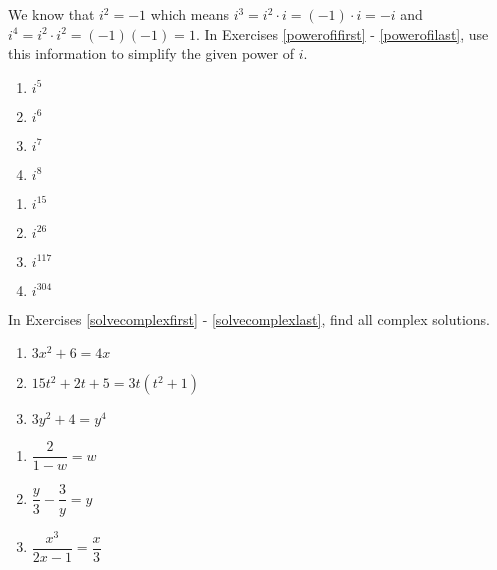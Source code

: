 \documentclass[10pt]{article}
\begin{document}
We know that $i^{2} = -1$ which means $i^{3} = i^{2} \cdot i = (-1) \cdot i = -i$ and $i^{4} = i^{2} \cdot i^{2} = (-1)(-1) = 1$. In Exercises \ref{powerofifirst} - \ref{powerofilast}, use this information to simplify the given power of $i$.

\begin{multicols}{4}
\begin{enumerate}
\setcounter{enumi}{\value{HW}}

\item $i^{5}$ \label{powerofifirst}
\item $i ^{6}$
\item $i^{7}$
\item $i^{8}$

\setcounter{HW}{\value{enumi}}
\end{enumerate}
\end{multicols}

\begin{multicols}{4}
\begin{enumerate}
\setcounter{enumi}{\value{HW}}

\item $i^{15}$
\item $i^{26}$
\item $i^{117}$
\item $i^{304}$ \label{powerofilast}

\setcounter{HW}{\value{enumi}}
\end{enumerate}
\end{multicols}

In Exercises \ref{solvecomplexfirst} - \ref{solvecomplexlast}, find all complex solutions.

\begin{multicols}{3}
\begin{enumerate}
\setcounter{enumi}{\value{HW}}

\item $3x^2 + 6 = 4x$ \label{solvecomplexfirst}
\item  $15t^2+2t+5= 3t(t^2+1)$
\item  $3y^2 + 4 = y^4$

\setcounter{HW}{\value{enumi}}
\end{enumerate}
\end{multicols}
\begin{multicols}{3}
\begin{enumerate}
\setcounter{enumi}{\value{HW}}

\item $\dfrac{2}{1-w}= w$ 
\item $\dfrac{y}{3} - \dfrac{3}{y} = y$ 
\item $\dfrac{x^3}{2x-1} = \dfrac{x}{3}$ 

\setcounter{HW}{\value{enumi}}
\end{enumerate}
\end{multicols}
\end{document}
